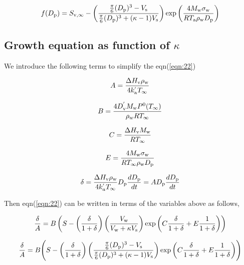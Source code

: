\documentclass[12pt]{article}
\begin{document}
\begin{equation}
f(D_{\rm p})=S_{\rm v, \infty}-\left(\frac{\frac{\pi}{6}(D_{\rm p})^{3}-V_{\rm s}} {\frac{\pi}{6}(D_{\rm p})^{3}+(\kappa-1)V_{\rm s}}\right)
\exp{\left(\frac{4 M_{\rm w} \sigma_{\rm w}}{R T_{\rm a} \rho_{\rm w} D_{\rm p}}\right)}
\end{equation}

\subsection{Growth equation as function of $\kappa$}

We introduce the following terms to simplify the eqn(\ref{eqn:22})

\begin{equation}
A=\frac{\Delta H_{\rm v} \rho_{\rm w}}{4 k_{\rm a}^{'} T_{\infty}}
\end{equation}

\begin{equation}
B=\frac{4 D_{\rm v}^{'} M_{\rm w} P^{\rm 0}(T_{\infty})}{\rho_w R T_{\infty}}
\end{equation}

\begin{equation}
C=\frac{\Delta H_{\rm v} M_{\rm w}}{R T_{\infty}}
\end{equation}

\begin{equation}
E=\frac{4 M_{\rm w}\sigma_{\rm w}}{R T_{\infty} \rho_{\rm w} D_{\rm p}}
\end{equation}

\begin{equation}\label{eqn:23}
\delta=\frac{\Delta H_{\rm v} \rho_{\rm w}}{4 k_a^{'} T_{\infty}} D_{\rm p} \frac{d D_{\rm p}}{dt}=A D_{\rm p} \frac{d D_{\rm p}}{dt}
\end{equation}

Then eqn(\ref{eqn:22}) can be written in terms of the variables above as follows,

\begin{equation}\label{eqn:22a}
\frac{\delta}{A}=B \left(S-\left(\frac{\delta}{1+\delta}\right) \left(\frac{V_{\rm w}}{V_{\rm w}+\kappa V_{\rm s}}\right)\exp{\left(C \frac{\delta}{1+\delta} +E \frac{1}{1+\delta}\right)}\right)
\end{equation}

\begin{equation}\label{eqn:22a}
\frac{\delta}{A}=B \Bigg(S-\left(\frac{\delta}{1+\delta}\right) \left(\frac{\frac{\pi}{6}(D_{\rm p})^{3}-V_{\rm s}} {\frac{\pi}{6}(D_{\rm p})^{3}+(\kappa-1)V_{\rm s}}\right)\exp{\left(C \frac{\delta}{1+\delta} +E \frac{1}{1+\delta}\right)} \Bigg)
\end{equation}
\end{document}
